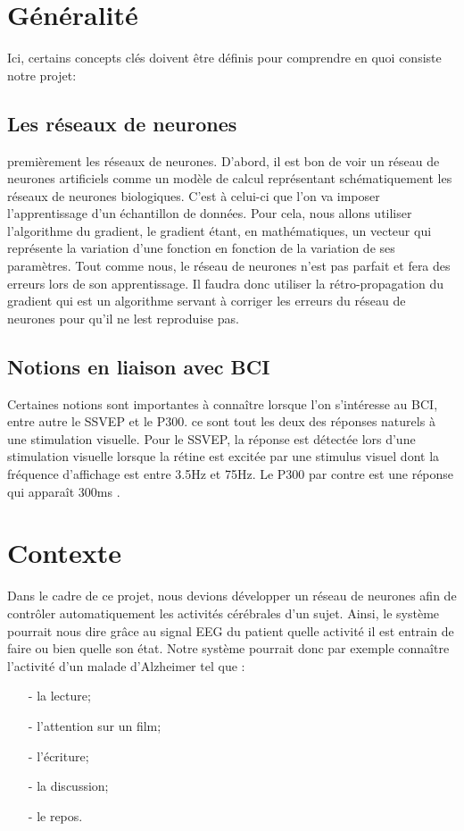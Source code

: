 	\section{Généralité} %
	\label{sec:généralité}
	
	Ici, certains concepts clés doivent être définis pour comprendre en quoi consiste notre projet: 
	\subsection{Les réseaux de neurones} %
	\label{sub:les_réseaux_de_neurones}
	premièrement les réseaux de neurones. D'abord, il est bon de voir un réseau de neurones artificiels comme un modèle de calcul représentant schématiquement les réseaux de neurones biologiques. C'est à celui-ci que 
	l'on va imposer l'apprentissage d'un échantillon de données. Pour cela, nous allons 
	utiliser l'algorithme du gradient, le gradient étant, en mathématiques, un vecteur qui
	 représente la variation d'une fonction en fonction de la variation de ses paramètres. Tout
	  comme nous, le réseau de neurones n'est pas parfait et fera des erreurs lors de son 
	  apprentissage. Il faudra donc utiliser la rétro-propagation du gradient qui est un algorithme 
	  servant à corriger les erreurs du réseau de neurones pour qu'il ne lest reproduise pas.

	\subsection{Notions en liaison avec BCI} %
	\label{sub:notion_lien}
	Certaines notions sont importantes à connaître lorsque l'on s’intéresse au BCI, entre autre le SSVEP  et le P300. ce sont tout les deux des réponses naturels à une stimulation visuelle. Pour le SSVEP, la réponse est détectée lors d'une stimulation visuelle lorsque la rétine est excitée par une stimulus visuel dont la fréquence d'affichage est entre 3.5Hz et 75Hz. Le P300 par contre 
	est une réponse qui apparaît 300ms . 
	

	\section{Contexte} %
	\label{sec:contexte}
	
	   Dans le cadre de ce projet, nous devions développer un réseau de neurones afin de contrôler 
	   automatiquement les activités cérébrales d'un sujet. Ainsi, le système pourrait nous dire grâce au signal EEG
	    du patient quelle activité il est entrain de faire ou bien quelle son état. 
	   Notre système pourrait donc par exemple connaître l'activité d'un malade d'Alzheimer tel que : 
	   \begin{itemize}
	   	\item[-] la lecture;
		\item[-] l'attention sur un film;
		\item[-] l'écriture;
		\item[-] la discussion;
		\item[-] le repos.
	   \end{itemize}
	
	
	
	

